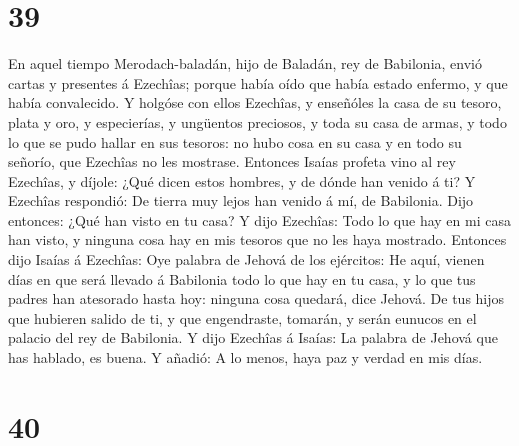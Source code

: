 \hypertarget{section-38}{%
\section{39}\label{section-38}}

 En aquel tiempo Merodach-baladán, hijo de Baladán, rey de
Babilonia, envió cartas y presentes á Ezechîas; porque había oído que
había estado enfermo, y que había convalecido.  Y holgóse
con ellos Ezechîas, y enseñóles la casa de su tesoro, plata y oro, y
especierías, y ungüentos preciosos, y toda su casa de armas, y todo lo
que se pudo hallar en sus tesoros: no hubo cosa en su casa y en todo su
señorío, que Ezechîas no les mostrase.  Entonces Isaías
profeta vino al rey Ezechîas, y díjole: ¿Qué dicen estos hombres, y de
dónde han venido á ti? Y Ezechîas respondió: De tierra muy lejos han
venido á mí, de Babilonia.  Dijo entonces: ¿Qué han visto en
tu casa? Y dijo Ezechîas: Todo lo que hay en mi casa han visto, y
ninguna cosa hay en mis tesoros que no les haya mostrado. 
Entonces dijo Isaías á Ezechîas: Oye palabra de Jehová de los ejércitos:
 He aquí, vienen días en que será llevado á Babilonia todo
lo que hay en tu casa, y lo que tus padres han atesorado hasta hoy:
ninguna cosa quedará, dice Jehová.  De tus hijos que
hubieren salido de ti, y que engendraste, tomarán, y serán eunucos en el
palacio del rey de Babilonia.  Y dijo Ezechîas á Isaías: La
palabra de Jehová que has hablado, es buena. Y añadió: A lo menos, haya
paz y verdad en mis días.

\hypertarget{section-39}{%
\section{40}\label{section-39}}

